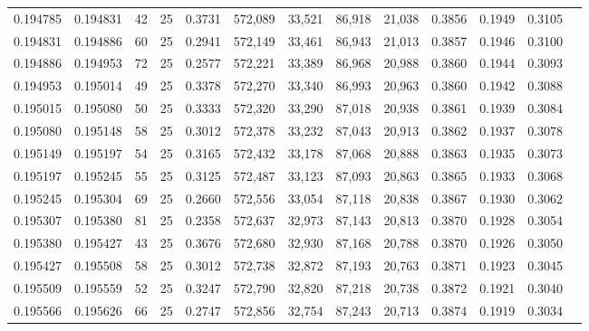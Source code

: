 \begin{tabular}{rrrrrrrrrrrrr}
0.194785 & 0.194831 &  42 &  25 &                                     0.3731 & 572,089 &  33,521 &  86,918 &  21,038 & 0.3856 & 0.1949 & 0.3105 \\
0.194831 & 0.194886 &  60 &  25 &                                     0.2941 & 572,149 &  33,461 &  86,943 &  21,013 & 0.3857 & 0.1946 & 0.3100 \\
0.194886 & 0.194953 &  72 &  25 &                                     0.2577 & 572,221 &  33,389 &  86,968 &  20,988 & 0.3860 & 0.1944 & 0.3093 \\
0.194953 & 0.195014 &  49 &  25 &                                     0.3378 & 572,270 &  33,340 &  86,993 &  20,963 & 0.3860 & 0.1942 & 0.3088 \\
0.195015 & 0.195080 &  50 &  25 &                                     0.3333 & 572,320 &  33,290 &  87,018 &  20,938 & 0.3861 & 0.1939 & 0.3084 \\
0.195080 & 0.195148 &  58 &  25 &                                     0.3012 & 572,378 &  33,232 &  87,043 &  20,913 & 0.3862 & 0.1937 & 0.3078 \\
0.195149 & 0.195197 &  54 &  25 &                                     0.3165 & 572,432 &  33,178 &  87,068 &  20,888 & 0.3863 & 0.1935 & 0.3073 \\
0.195197 & 0.195245 &  55 &  25 &                                     0.3125 & 572,487 &  33,123 &  87,093 &  20,863 & 0.3865 & 0.1933 & 0.3068 \\
0.195245 & 0.195304 &  69 &  25 &                                     0.2660 & 572,556 &  33,054 &  87,118 &  20,838 & 0.3867 & 0.1930 & 0.3062 \\
0.195307 & 0.195380 &  81 &  25 &                                     0.2358 & 572,637 &  32,973 &  87,143 &  20,813 & 0.3870 & 0.1928 & 0.3054 \\
0.195380 & 0.195427 &  43 &  25 &                                     0.3676 & 572,680 &  32,930 &  87,168 &  20,788 & 0.3870 & 0.1926 & 0.3050 \\
0.195427 & 0.195508 &  58 &  25 &                                     0.3012 & 572,738 &  32,872 &  87,193 &  20,763 & 0.3871 & 0.1923 & 0.3045 \\
0.195509 & 0.195559 &  52 &  25 &                                     0.3247 & 572,790 &  32,820 &  87,218 &  20,738 & 0.3872 & 0.1921 & 0.3040 \\
0.195566 & 0.195626 &  66 &  25 &                                     0.2747 & 572,856 &  32,754 &  87,243 &  20,713 & 0.3874 & 0.1919 & 0.3034 \\

\end{tabular}
